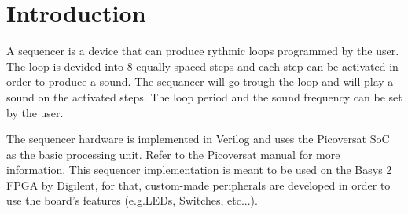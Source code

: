 \section{Introduction}

\noindent
A sequencer is a device that can produce rythmic loops programmed by the user. The loop is devided into 8 equally spaced steps and each step can be activated in order to produce a sound. The sequancer will go trough the loop and will play a sound on the activated steps. The loop period and the sound frequency can be set by the user.

\noindent
The sequencer hardware is implemented in Verilog and uses the Picoversat SoC as the basic processing unit. Refer to the Picoversat manual for more information. 
This sequencer implementation is meant to be used on the Basys 2 FPGA by Digilent, for that, custom-made peripherals are developed in order to use the board's features (e.g.LEDs, Switches, etc...).
